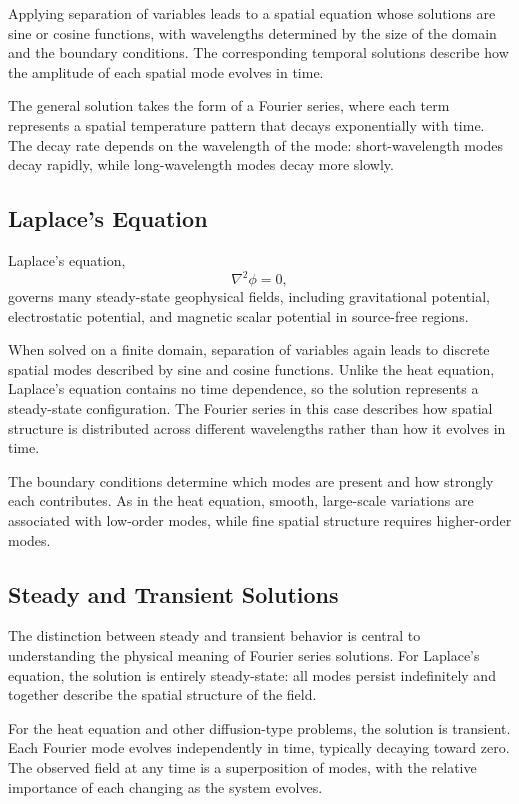 Applying separation of variables leads to a spatial equation whose solutions are sine or cosine functions, with wavelengths determined by the size of the domain and the boundary conditions. The corresponding temporal solutions describe how the amplitude of each spatial mode evolves in time.

The general solution takes the form of a Fourier series, where each term represents a spatial temperature pattern that decays exponentially with time. The decay rate depends on the wavelength of the mode: short-wavelength modes decay rapidly, while long-wavelength modes decay more slowly.

\subsection{Laplace's Equation}

Laplace's equation,
\begin{equation}
    \nabla^2 \phi = 0,
\end{equation}
governs many steady-state geophysical fields, including gravitational potential, electrostatic potential, and magnetic scalar potential in source-free regions.

When solved on a finite domain, separation of variables again leads to discrete spatial modes described by sine and cosine functions. Unlike the heat equation, Laplace's equation contains no time dependence, so the solution represents a steady-state configuration. The Fourier series in this case describes how spatial structure is distributed across different wavelengths rather than how it evolves in time.

The boundary conditions determine which modes are present and how strongly each contributes. As in the heat equation, smooth, large-scale variations are associated with low-order modes, while fine spatial structure requires higher-order modes.

\subsection{Steady and Transient Solutions}

The distinction between steady and transient behavior is central to understanding the physical meaning of Fourier series solutions. For Laplace's equation, the solution is entirely steady-state: all modes persist indefinitely and together describe the spatial structure of the field.

For the heat equation and other diffusion-type problems, the solution is transient. Each Fourier mode evolves independently in time, typically decaying toward zero. The observed field at any time is a superposition of modes, with the relative importance of each changing as the system evolves.

